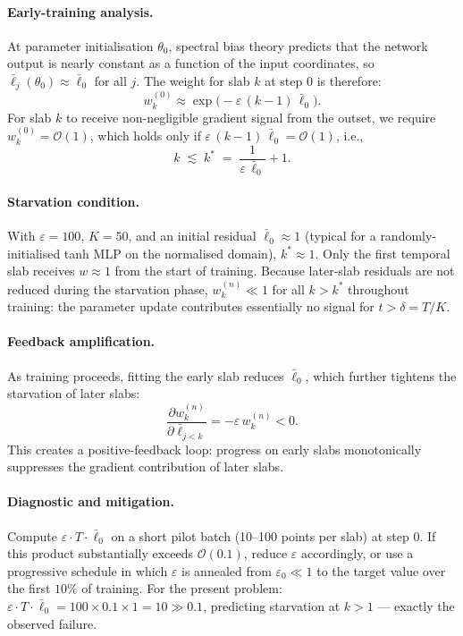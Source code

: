\documentclass{article}
\begin{document}
\paragraph{Early-training analysis.}
At parameter initialisation $\theta_0$, spectral bias theory
\citep{wang2021ntk} predicts that the network output is nearly constant
as a function of the input coordinates, so $\bar{\ell}_j(\theta_0)
\approx \bar{\ell}_0$ for all $j$.
The weight for slab $k$ at step 0 is therefore:
\begin{equation}
  w_k^{(0)} \approx \exp\bigl(-\varepsilon\,(k-1)\,\bar{\ell}_0\bigr).
\label{eq:w0}
\end{equation}
For slab $k$ to receive non-negligible gradient signal from the outset,
we require $w_k^{(0)} = \mathcal{O}(1)$, which holds only if
$\varepsilon\,(k-1)\,\bar{\ell}_0 = \mathcal{O}(1)$, i.e.,
\begin{equation}
  k \;\lesssim\; k^\ast \;=\; \frac{1}{\varepsilon\,\bar{\ell}_0} + 1.
\label{eq:k_star}
\end{equation}

\paragraph{Starvation condition.}
With $\varepsilon = 100$, $K = 50$, and an initial residual
$\bar{\ell}_0 \approx 1$ (typical for a randomly-initialised tanh MLP
on the normalised domain), $k^\ast \approx 1$.
Only the first temporal slab receives $w \approx 1$ from the start of
training.
Because later-slab residuals are not reduced during the starvation phase,
$w_k^{(n)} \ll 1$ for all $k > k^\ast$ throughout training: the parameter
update contributes essentially no signal for $t > \delta = T/K$.

\paragraph{Feedback amplification.}
As training proceeds, fitting the early slab reduces $\bar{\ell}_0$,
which further tightens the starvation of later slabs:
\begin{equation}
  \frac{\partial w_k^{(n)}}{\partial \bar{\ell}_{j<k}}
  = -\varepsilon\,w_k^{(n)} < 0.
\end{equation}
This creates a positive-feedback loop: progress on early slabs
monotonically suppresses the gradient contribution of later slabs.

\paragraph{Diagnostic and mitigation.}
Compute $\varepsilon\cdot T\cdot\bar{\ell}_0$ on a short pilot batch
(10--100 points per slab) at step 0.
If this product substantially exceeds $\mathcal{O}(0.1)$, reduce $\varepsilon$
accordingly, or use a progressive schedule in which $\varepsilon$ is annealed
from $\varepsilon_0 \ll 1$ to the target value over the first $10\%$ of
training.
For the present problem: $\varepsilon\cdot T\cdot\bar{\ell}_0
= 100\times0.1\times1 = 10 \gg 0.1$, predicting starvation at $k > 1$
— exactly the observed failure.
\end{document}
